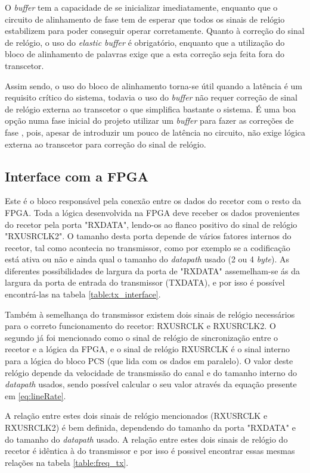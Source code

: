 O \textit{buffer} tem a capacidade de se inicializar imediatamente, enquanto que o circuito de alinhamento de fase tem de esperar que todos os sinais de relógio estabilizem para poder conseguir operar corretamente. Quanto à correção do sinal de relógio, o uso do\textit{ elastic buffer} é obrigatório, enquanto que a utilização do bloco de alinhamento de palavras exige que a esta correção seja feita fora do transcetor.

Assim sendo, o uso do bloco de alinhamento torna-se útil quando a latência é um requisito crítico do sistema, todavia o uso do \textit{buffer} não requer correção de sinal de relógio externa ao transcetor o que simplifica bastante o sistema. É uma boa opção numa fase inicial do projeto utilizar um \textit{buffer} para fazer as correções de fase , pois, apesar de introduzir um pouco de latência no circuito, não exige lógica externa ao transcetor para correção do sinal de relógio.

\subsection{Interface com a FPGA}

Este é o bloco responsável pela conexão entre os dados do recetor com o resto da FPGA. Toda a lógica desenvolvida na FPGA deve receber os dados provenientes do recetor pela porta "RXDATA", lendo-os ao flanco positivo do sinal de relógio "RXUSRCLK2". O tamanho desta porta depende de vários fatores internos do recetor, tal como acontecia no transmissor,  como por exemplo se a codificação está ativa ou não e ainda qual o tamanho do \textit{datapath} usado (2 ou 4 \textit{byte}). As diferentes possibilidades de largura da porta de "RXDATA" assemelham-se ás da largura da porta de entrada do transmissor (TXDATA), e por isso é possível encontrá-las na tabela \ref{table:tx_interface}.

Também à semelhança do transmissor existem dois sinais de relógio necessários para o correto funcionamento do recetor: RXUSRCLK e RXUSRCLK2. O segundo já foi mencionado como o sinal de relógio de sincronização entre o recetor e a lógica da FPGA, e o sinal de relógio RXUSRCLK é o sinal interno para a lógica do bloco PCS (que lida com os dados em paralelo). O valor deste relógio depende da velocidade de transmissão do canal e do tamanho interno do \textit{datapath} usados, sendo possível calcular o seu valor através da equação presente em \ref{eq:lineRate}.

A relação entre estes dois sinais de relógio mencionados (RXUSRCLK e RXUSRCLK2) é bem definida, dependendo do tamanho da porta "RXDATA" e do tamanho do \textit{datapath} usado.  A relação entre estes dois sinais de relógio do recetor é idêntica à do transmissor e por isso é possivel encontrar essas mesmas relações na tabela \ref{table:freq_tx}.


